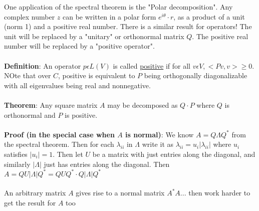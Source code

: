 \documentclass{article}
\begin{document}
One application of the spectral theorem is the "Polar decomposition". Any complex number $z$ can be written in a polar form $e^{i\theta} \cdot r$, as a product of a unit (norm 1) and a positive real number. There is a similar result for operators! The unit will be replaced by a "unitary" or orthonormal matrix $Q$. The positive real number will be replaced by a "positive operator". \\\\
\textbf{Definition}: An operator $p \epsilon L(V)$ is called \underline{positive} if for all $v \epsilon V, <Pv,v> \geq 0$. NOte that over $C$, positive is equivalent to $P$ being orthogonally diagonalizable with all eigenvalues being real and nonnegative. \\\\
\textbf{Theorem}: Any square matrix $A$ may be decomposed as $Q \cdot P$ where $Q$ is orthonormal and $P$ is positive. \\\\
\textbf{Proof (in the special case when $A$ is normal)}: We know $A = Q \Lambda Q^*$ from the spectral theorem. Then for each $\lambda_{ii}$ in $\Lambda$ write it as $\lambda_{ii} = u_i |\lambda_{ii}|$ where $u_i$ satisfies $|u_i| = 1$. Then let $U$ be a matrix with just entries along the diagonal, and similarly $|\Lambda|$ just has entries along the diagonal. Then $A = QU |\Lambda|Q^* = QUQ^* \cdot Q|\Lambda|Q^*$\\\\
An arbitrary matrix $A$ gives rise to a normal matrix $A^* A$... then work harder to get the result for $A$ too
\end{document}

